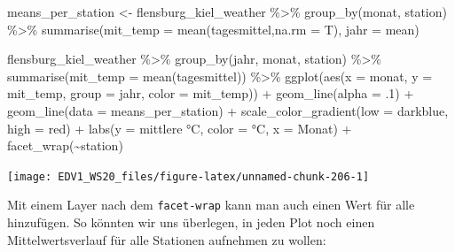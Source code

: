 \documentclass[
]{book}
\newenvironment{Shaded}{\begin{snugshade}}{\end{snugshade}}
\newcommand{\AttributeTok}[1]{\textcolor[rgb]{0.77,0.63,0.00}{#1}}
\newcommand{\DecValTok}[1]{\textcolor[rgb]{0.00,0.00,0.81}{#1}}
\newcommand{\FunctionTok}[1]{\textcolor[rgb]{0.00,0.00,0.00}{#1}}
\newcommand{\NormalTok}[1]{#1}
\newcommand{\OtherTok}[1]{\textcolor[rgb]{0.56,0.35,0.01}{#1}}
\newcommand{\SpecialCharTok}[1]{\textcolor[rgb]{0.00,0.00,0.00}{#1}}
\newcommand{\StringTok}[1]{\textcolor[rgb]{0.31,0.60,0.02}{#1}}
\begin{document}
\begin{Shaded}
\begin{Highlighting}[]
\NormalTok{means\_per\_station }\OtherTok{\textless{}{-}}\NormalTok{ flensburg\_kiel\_weather }\SpecialCharTok{\%\textgreater{}\%} 
  \FunctionTok{group\_by}\NormalTok{(monat, station) }\SpecialCharTok{\%\textgreater{}\%} 
  \FunctionTok{summarise}\NormalTok{(}\AttributeTok{mit\_temp =} \FunctionTok{mean}\NormalTok{(tagesmittel,}\AttributeTok{na.rm =}\NormalTok{ T),}
            \AttributeTok{jahr =} \StringTok{\textquotesingle{}mean\textquotesingle{}}\NormalTok{)}


\NormalTok{flensburg\_kiel\_weather }\SpecialCharTok{\%\textgreater{}\%} 
  \FunctionTok{group\_by}\NormalTok{(jahr, monat, station) }\SpecialCharTok{\%\textgreater{}\%} 
  \FunctionTok{summarise}\NormalTok{(}\AttributeTok{mit\_temp =} \FunctionTok{mean}\NormalTok{(tagesmittel)) }\SpecialCharTok{\%\textgreater{}\%} 
  \FunctionTok{ggplot}\NormalTok{(}\FunctionTok{aes}\NormalTok{(}\AttributeTok{x =}\NormalTok{ monat, }
             \AttributeTok{y =}\NormalTok{ mit\_temp,}
             \AttributeTok{group =}\NormalTok{ jahr,}
             \AttributeTok{color =}\NormalTok{ mit\_temp)) }\SpecialCharTok{+}
  \FunctionTok{geom\_line}\NormalTok{(}\AttributeTok{alpha =}\NormalTok{ .}\DecValTok{1}\NormalTok{) }\SpecialCharTok{+}
  \FunctionTok{geom\_line}\NormalTok{(}\AttributeTok{data =}\NormalTok{ means\_per\_station) }\SpecialCharTok{+}
  \FunctionTok{scale\_color\_gradient}\NormalTok{(}\AttributeTok{low =} \StringTok{\textquotesingle{}darkblue\textquotesingle{}}\NormalTok{,}
                       \AttributeTok{high =} \StringTok{\textquotesingle{}red\textquotesingle{}}\NormalTok{) }\SpecialCharTok{+}
  \FunctionTok{labs}\NormalTok{(}\AttributeTok{y =} \StringTok{\textquotesingle{}mittlere °C\textquotesingle{}}\NormalTok{,}
       \AttributeTok{color =} \StringTok{\textquotesingle{}°C\textquotesingle{}}\NormalTok{,}
       \AttributeTok{x =} \StringTok{\textquotesingle{}Monat\textquotesingle{}}\NormalTok{) }\SpecialCharTok{+}
  \FunctionTok{facet\_wrap}\NormalTok{(}\SpecialCharTok{\textasciitilde{}}\NormalTok{station)}
\end{Highlighting}
\end{Shaded}

\begin{center}\texttt{[image: EDV1\_WS20\_files/figure-latex/unnamed-chunk-206-1]} \end{center}

Mit einem Layer nach dem \texttt{facet-wrap} kann man auch einen Wert für alle hinzufügen. So könnten wir uns überlegen, in jeden Plot noch einen Mittelwertsverlauf für alle Stationen aufnehmen zu wollen:
\end{document}

